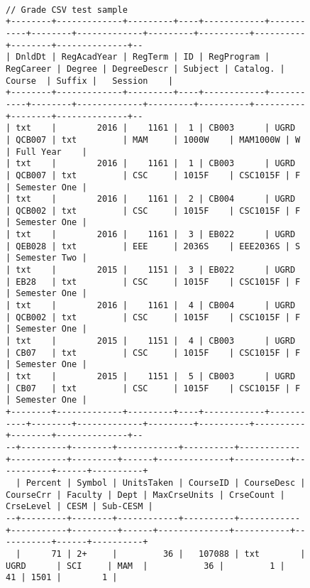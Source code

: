 \begin{figure}[H]
    \centering
    \begin{mdframed}[rightline=false,leftline=false]
        \centering
        \begin{BVerbatim}[fontsize=\tiny]

// Grade CSV test sample
+--------+-------------+---------+----+------------+-----------+--------+-------------+---------+----------+----------+--------+--------------+--
| DnldDt | RegAcadYear | RegTerm | ID | RegProgram | RegCareer | Degree | DegreeDescr | Subject | Catalog. |  Course  | Suffix |   Session    |
+--------+-------------+---------+----+------------+-----------+--------+-------------+---------+----------+----------+--------+--------------+--
| txt    |        2016 |    1161 |  1 | CB003      | UGRD      | QCB007 | txt         | MAM     | 1000W    | MAM1000W | W      | Full Year    |
| txt    |        2016 |    1161 |  1 | CB003      | UGRD      | QCB007 | txt         | CSC     | 1015F    | CSC1015F | F      | Semester One |
| txt    |        2016 |    1161 |  2 | CB004      | UGRD      | QCB002 | txt         | CSC     | 1015F    | CSC1015F | F      | Semester One |
| txt    |        2016 |    1161 |  3 | EB022      | UGRD      | QEB028 | txt         | EEE     | 2036S    | EEE2036S | S      | Semester Two |
| txt    |        2015 |    1151 |  3 | EB022      | UGRD      | EB28   | txt         | CSC     | 1015F    | CSC1015F | F      | Semester One |
| txt    |        2016 |    1161 |  4 | CB004      | UGRD      | QCB002 | txt         | CSC     | 1015F    | CSC1015F | F      | Semester One |
| txt    |        2015 |    1151 |  4 | CB003      | UGRD      | CB07   | txt         | CSC     | 1015F    | CSC1015F | F      | Semester One |
| txt    |        2015 |    1151 |  5 | CB003      | UGRD      | CB07   | txt         | CSC     | 1015F    | CSC1015F | F      | Semester One |
+--------+-------------+---------+----+------------+-----------+--------+-------------+---------+----------+----------+--------+--------------+--
--+---------+--------+------------+----------+------------+-----------+---------+------+--------------+-----------+-----------+------+----------+
  | Percent | Symbol | UnitsTaken | CourseID | CourseDesc | CourseCrr | Faculty | Dept | MaxCrseUnits | CrseCount | CrseLevel | CESM | Sub-CESM |
--+---------+--------+------------+----------+------------+-----------+---------+------+--------------+-----------+-----------+------+----------+
  |      71 | 2+     |         36 |   107088 | txt        | UGRD      | SCI     | MAM  |           36 |         1 |        41 | 1501 |        1 |

\end{BVerbatim}
\end{mdframed}
\end{figure}
